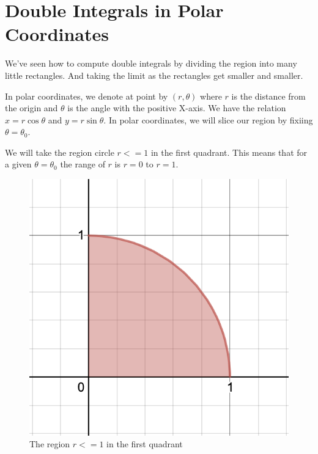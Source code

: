 

\chapter{Double Integrals in Polar Coordinates}

\bigbreak

We've seen how to compute double integrals by dividing the region into many little rectangles.
And taking the limit as the rectangles get smaller and smaller.

In polar coordinates, we denote at point by $(r, \theta)$ where $r$ is the distance from the origin and $\theta$ is the angle with the positive X-axis.
We have the relation $x = r \cos \theta$ and $y = r \sin \theta$.
In polar coordinates, we will slice our region by fixiing $\theta = \theta_0$.

We will take the region circle $r <= 1$ in the first quadrant.
This means that for a given $\theta = \theta_0$ the range of $r$ is $r = 0$ to $r = 1$.

\begin{figure}[ht!]
    \centering
    \includegraphics[scale=0.5]{./images/lecture_12_figure_1.png}
    \caption{The region $r <= 1$ in the first quadrant}
\end{figure}

